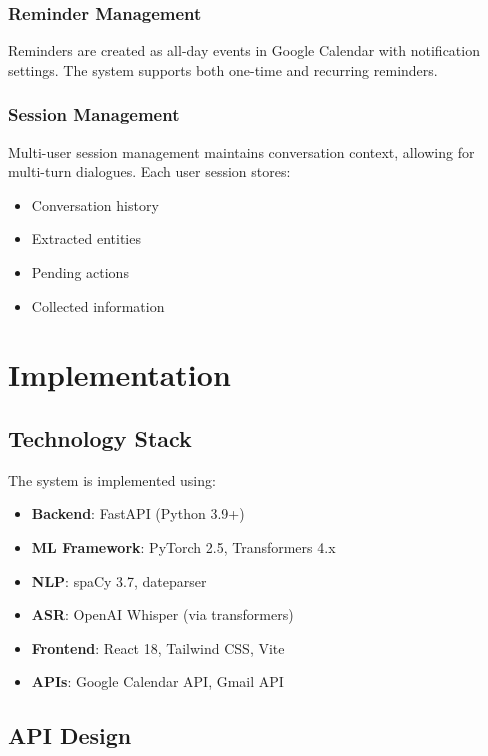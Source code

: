 \documentclass[conference]{IEEEtran}
\begin{document}
\subsubsection{Reminder Management}

Reminders are created as all-day events in Google Calendar with notification settings. The system supports both one-time and recurring reminders.

\subsubsection{Session Management}

Multi-user session management maintains conversation context, allowing for multi-turn dialogues. Each user session stores:
\begin{itemize}
    \item Conversation history
    \item Extracted entities
    \item Pending actions
    \item Collected information
\end{itemize}

\section{Implementation}

\subsection{Technology Stack}

The system is implemented using:
\begin{itemize}
    \item \textbf{Backend}: FastAPI (Python 3.9+)
    \item \textbf{ML Framework}: PyTorch 2.5, Transformers 4.x
    \item \textbf{NLP}: spaCy 3.7, dateparser
    \item \textbf{ASR}: OpenAI Whisper (via transformers)
    \item \textbf{Frontend}: React 18, Tailwind CSS, Vite
    \item \textbf{APIs}: Google Calendar API, Gmail API
\end{itemize}

\subsection{API Design}
\end{document}

